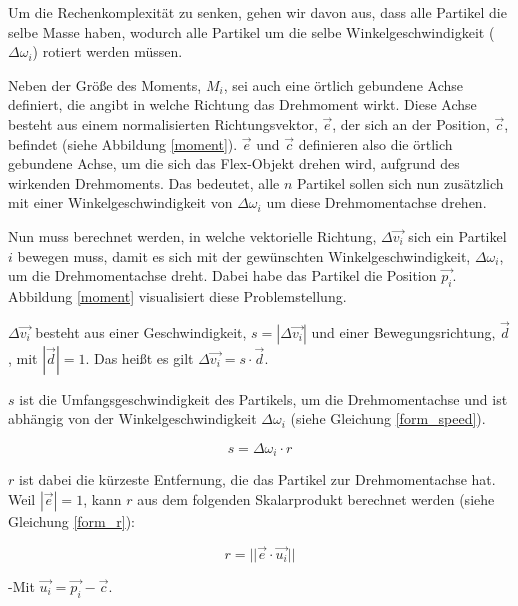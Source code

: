 Um die Rechenkomplexität zu senken, gehen wir davon aus, dass alle Partikel die selbe Masse haben, wodurch alle Partikel um die selbe Winkelgeschwindigkeit ($\Delta \omega_i$) rotiert werden müssen. 

Neben der Größe des Moments, $M_i$, sei auch eine örtlich gebundene Achse definiert, die angibt in welche Richtung das Drehmoment wirkt. Diese Achse besteht aus einem normalisierten Richtungsvektor, $\vec{e}$, der sich an der Position, $\vec{c}$, befindet (siehe Abbildung \ref{moment}). $\vec{e}$ und $\vec{c}$ definieren also die örtlich gebundene Achse, um die sich das Flex-Objekt drehen wird, aufgrund des wirkenden Drehmoments. Das bedeutet, alle $n$ Partikel sollen sich nun zusätzlich mit einer Winkelgeschwindigkeit von $\Delta \omega_i$ um diese Drehmomentachse drehen.

Nun muss berechnet werden, in welche vektorielle Richtung, $\Delta \vec{v_i}$ sich ein Partikel $i$ bewegen muss, damit es sich mit der gewünschten Winkelgeschwindigkeit, $\Delta \omega_i$, um die Drehmomentachse dreht. Dabei habe das Partikel die Position $\vec{p_i}$. Abbildung \ref{moment} visualisiert diese Problemstellung.



$\Delta \vec{v_i}$ besteht aus einer Geschwindigkeit, $s=|\Delta \vec{v_i}|$ und einer Bewegungsrichtung, $\vec{d}$, mit $|\vec{d}|=1$. Das heißt es gilt $\Delta \vec{v_i} = s \cdot \vec{d}$.

$s$ ist die Umfangsgeschwindigkeit des Partikels, um die Drehmomentachse und ist abhängig von der Winkelgeschwindigkeit $\Delta \omega_i$ (siehe Gleichung \ref{form_speed}).

\begin{equation}
s = \Delta \omega_i \cdot r
\label{form_speed}
\end{equation}

$r$ ist dabei die kürzeste Entfernung, die das Partikel zur Drehmomentachse hat.
Weil $|\vec{e}|=1$, kann $r$ aus dem folgenden Skalarprodukt berechnet werden (siehe Gleichung \ref{form_r}):

\begin{equation}
r = ||\vec{e} \cdot \vec{u_i}||
\label{form_r}
\end{equation}

-Mit $\vec{u_i}=\vec{p_i}-\vec{c}$. 

